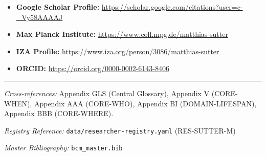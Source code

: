 \begin{itemize}[nosep]
    \item \textbf{Google Scholar Profile:} \url{https://scholar.google.com/citations?user=c-_Vy58AAAAJ}
    \item \textbf{Max Planck Institute:} \url{https://www.coll.mpg.de/matthias-sutter}
    \item \textbf{IZA Profile:} \url{https://www.iza.org/person/3086/matthias-sutter}
    \item \textbf{ORCID:} \url{https://orcid.org/0000-0002-6143-8406}
\end{itemize}



\vspace{1em}
\hrule
\vspace{0.5em}

\noindent\textit{Cross-references:}
Appendix GLS (Central Glossary),
Appendix V (CORE-WHEN),
Appendix AAA (CORE-WHO),
Appendix BI (DOMAIN-LIFESPAN),
Appendix BBB (CORE-WHERE).

\noindent\textit{Registry Reference:} \texttt{data/researcher-registry.yaml} (RES-SUTTER-M)

\noindent\textit{Master Bibliography:} \texttt{bcm\_master.bib}

